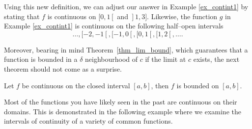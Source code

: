 Using this new definition, we can adjust our answer in Example \ref{ex_contint1} by stating that $f$ is continuous on $[0,1\left[\right.$ and $\left.\right]1,3]$. Likewise, the function $g$ in Example \ref{ex_contint1}  is continuous on the following half--open intervals 
$$\ldots, [-2,-1\left[\right., [-1,0\left[\right., [0,1\left[\right., [1,2\left[\right., \ldots.$$

\ifcourse
\ifanalysis

Moreover, bearing in mind Theorem~\ref{thm_lim_bound}, which guarantees that a function is bounded in a $\delta$ neighbourhood of $c$ if the limit at $c$ exists, the next theorem should not come as a surprise. 

\begin{theorem}
Let $f$ be continuous on the closed interval $[a,b]$, then $f$ is bounded on $[a,b]$. 
\label{thm_lim_fun_bound}
\end{theorem}

\fi
\fi


Most of the functions you have likely seen in the past are continuous on their domains. This is demonstrated in the following example where we examine the intervals of continuity of a variety of common functions.


